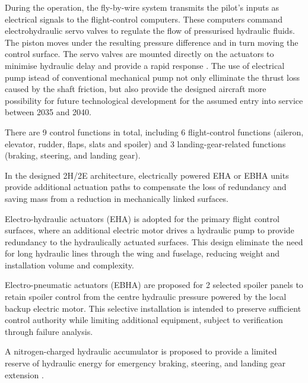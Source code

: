 During the operation, the fly-by-wire system transmits the pilot’s inputs as electrical signals to the flight-control computers. These computers command electrohydraulic servo valves to regulate the flow of pressurised hydraulic fluids. The piston moves under the resulting pressure difference and in turn moving the control surface. The servo valves are mounted directly on the actuators to minimise hydraulic delay and provide a rapid response \cite{Raymer Book}. The use of 
electrical pump istead of conventional mechanical pump not only elliminate the thrust loss caused by the shaft friction, but also provide the designed aircraft more possibility for future technological development for the assumed entry into service between 2035 and 2040. 

There are 9 control functions in total, including 6 flight-control functions (aileron, elevator, rudder, flaps, slats and spoiler) and 3 landing-gear-related functions (braking, steering, and landing gear).

In the designed 2H/2E architecture, electrically powered EHA or EBHA units provide additional actuation paths to compensate the loss of redundancy and saving mass from a reduction in mechanically linked surfaces. 

Electro-hydraulic actuators (EHA) is adopted for the primary flight control surfaces, where an additional electric motor drives a hydraulic pump to provide redundancy to the hydraulically actuated surfaces. This design eliminate the need for long hydraulic lines through the wing and fuselage, reducing weight and installation volume and complexity. 

Electro-pneumatic actuators (EBHA) are proposed for 2 selected spoiler panels \cite{Moog} to retain spoiler control from the centre hydraulic pressure powered by the local backup electric motor. This selective installation is intended to preserve sufficient control authority while limiting additional equipment, subject to verification through failure analysis.

A nitrogen-charged hydraulic accumulator is proposed to provide a limited reserve of hydraulic energy for emergency braking, steering, and landing gear extension \cite{HydraulicAccumulator}.

